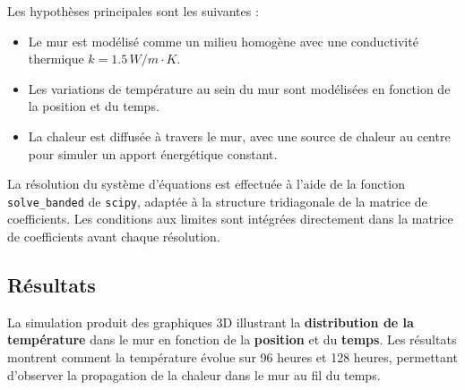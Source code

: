 \documentclass[a4paper,11pt]{article}
\begin{document}
Les hypothèses principales sont les suivantes :
\begin{itemize}
    \item Le mur est modélisé comme un milieu homogène avec une conductivité thermique \(k = 1.5 \, W/m \cdot K\).
    \item Les variations de température au sein du mur sont modélisées en fonction de la position et du temps.
    \item La chaleur est diffusée à travers le mur, avec une source de chaleur au centre pour simuler un apport énergétique constant.
\end{itemize}

La résolution du système d'équations est effectuée à l'aide de la fonction \texttt{solve\_banded} de \texttt{scipy}, adaptée à la structure tridiagonale de la matrice de coefficients. Les conditions aux limites sont intégrées directement dans la matrice de coefficients avant chaque résolution.
\subsection{Résultats}
La simulation produit des graphiques 3D illustrant la \textbf{distribution de la température} dans le mur en fonction de la \textbf{position} et du \textbf{temps}. Les résultats montrent comment la température évolue sur 96 heures et 128 heures, permettant d'observer la propagation de la chaleur dans le mur au fil du temps.
\end{document}

